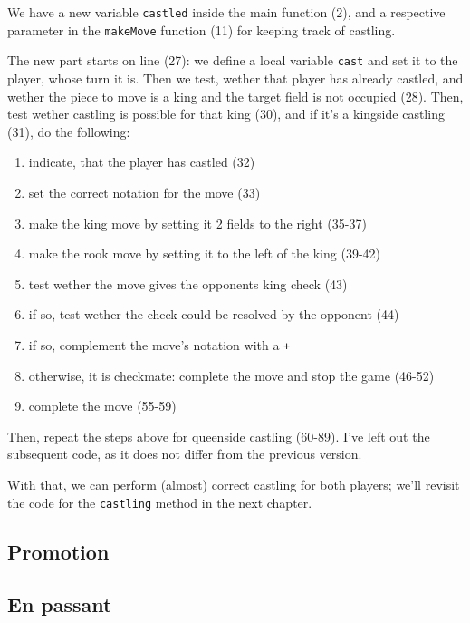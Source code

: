 We have a new variable \texttt{castled} inside the main function (2), and a respective parameter
in the \texttt{makeMove} function (11) for keeping track of castling.

The new part starts on line (27): we define a local variable \texttt{cast} and set it to the player,
whose turn it is.
Then we test, wether that player has already castled, and wether the piece to move is a king and the
target field is not occupied (28).
Then, test wether castling is possible for that king (30), and if it's a kingside castling (31),
do the following:
\begin{enumerate}
  \item indicate, that the player has castled (32)
  \item set the correct notation for the move (33)
  \item make the king move by setting it 2 fields to the right (35-37)
  \item make the rook move by setting it to the left of the king (39-42)
  \item test wether the move gives the opponents king check (43)
  \item if so, test wether the check could be resolved by the opponent (44)
  \item if so, complement the move's notation with a \texttt{+}
  \item otherwise, it is checkmate: complete the move and stop the game (46-52)
  \item complete the move (55-59)
\end{enumerate}

Then, repeat the steps above for queenside castling (60-89). I've left out the subsequent code, as
it does not differ from the previous version.

With that, we can perform (almost) correct castling for both players; we'll revisit the code for
the \texttt{castling} method in the next chapter.

\subsection{Promotion}

\subsection{En passant}

